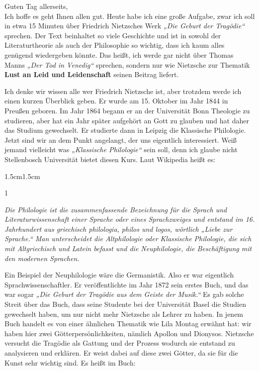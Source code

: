 \documentclass[12pt,a4paper]{article}
\begin{document}
Guten Tag allerseits,\\
Ich hoffe es geht Ihnen allen gut. Heute habe ich eine große Aufgabe, zwar ich soll in etwa 15 Minuten über Friedrich Nietzsches Werk \textit{„Die Geburt der Tragödie“} sprechen. Der Text beinhaltet so viele Geschichte und ist in sowohl der Literaturtheorie als auch der Philosophie so wichtig, dass ich kaum alles genügend wiedergeben könnte. Das heißt, ich werde gar nicht über Thomas Manns \textit{„Der Tod in Venedig“} sprechen, sondern nur wie Nietzsche zur Thematik \textbf{Lust an Leid und Leidenschaft} seinen Beitrag liefert.\par

Ich denke wir wissen alle wer Friedrich Nietzsche ist, aber trotzdem werde ich einen kurzen Überblick geben. Er wurde am 15. Oktober im Jahr 1844 in  Preußen geboren. Im Jahr 1864 begann er an der Universität Bonn Theologie zu studieren, aber hat ein Jahr später aufgehört an Gott zu glauben und hat daher das Studium gewechselt. Er studierte dann in Leipzig die Klassische Philologie. Jetzt sind wir an dem Punkt angelangt, der uns eigentlich interessiert. Weiß jemand vielleicht was \textit{„Klassische Philologie“} sein soll, denn ich glaube nicht Stellenbosch Universität bietet diesen Kurs. Laut Wikipedia heißt es:
\begin{adjustwidth}{1.5cm}{1.5cm}
    \begin{spacing}{1}
        \begin{center}
            \small
                \textit{Die Philologie ist die zusammenfassende Bezeichnung für die Sprach und Literaturwissenschaft einer Sprache oder eines Sprachzweiges und entstand im 16. Jahrhundert aus griechisch philologia, philos und logos, wörtlich „Liebe zur Sprache.“ Man unterscheidet die Altphilologie oder Klassische Philologie, die sich mit Altgriechisch und Latein befasst und die Neuphilologie, die Beschäftigung mit den modernen Sprachen.}
        \end{center}
    \end{spacing}
\end{adjustwidth}
Ein Beispiel der Neuphilologie wäre die Germanistik. Also er war eigentlich Sprachwissenschaftler. Er veröffentlichte im Jahr 1872 sein erstes Buch, und das war sogar \textit{„Die Geburt der Tragödie aus dem Geiste der Musik.“} Es gab solche Streit über das Buch, dass seine Studente bei der Universität Basel die Studien gewechselt haben, um nur nicht mehr Nietzsche als Lehrer zu haben. In jenem Buch handelt es von einer ähnlichen Thematik wie Lila Montag erwähnt hat: wir haben hier zwei Götterpersönlichkeiten, nämlich Apollon und Dionysos. Nietzsche versucht die Tragödie als Gattung und der Prozess wodurch sie entstand zu analysieren und erklären. Er weist dabei auf diese zwei Götter, da sie für die Kunst sehr wichtig sind. Es heißt im Buch:
\end{document}
